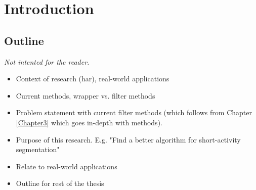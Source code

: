 
\chapter{Introduction}

\label{Chapter1} %



\section{Outline}
\emph{Not intented for the reader.}
\begin{itemize}
  \item Context of research (\gls{har}), real-world applications
  \item Current methods, wrapper vs. filter methods
  \item Problem statement with current filter methods (which follows from Chapter \ref{Chapter3} which goes in-depth with methods).
  \item Purpose of this research. E.g. "Find a better algorithm for short-activity segmentation"
  \item Relate to real-world applications
  \item Outline for rest of the thesis
\end{itemize}